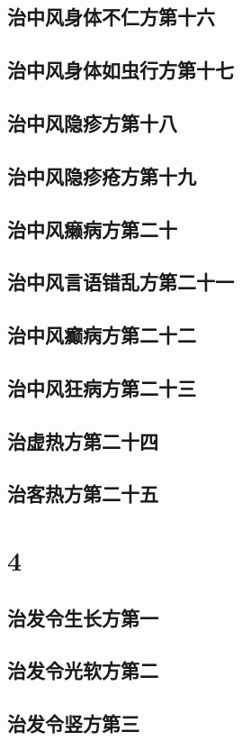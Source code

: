 \documentclass[a4paper,12pt,UTF8,twoside]{ctexbook}
\begin{document}
\chapter{治中风身体不仁方第十六}
\chapter{治中风身体如虫行方第十七}
\chapter{治中风隐疹方第十八}
\chapter{治中风隐疹疮方第十九}
\chapter{治中风癞病方第二十}
\chapter{治中风言语错乱方第二十一}
\chapter{治中风癫病方第二十二}
\chapter{治中风狂病方第二十三}
\chapter{治虚热方第二十四}
\chapter{治客热方第二十五}

\part{4}
\chapter{治发令生长方第一}
\chapter{治发令光软方第二}
\chapter{治发令竖方第三}
\end{document}
